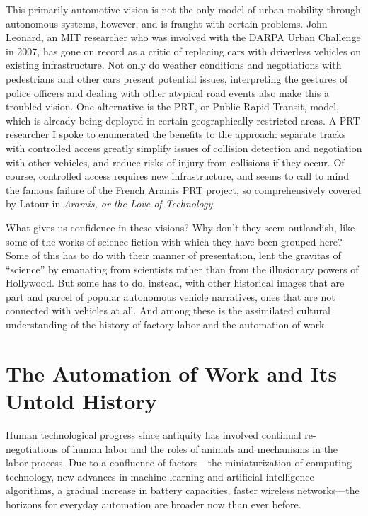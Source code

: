 This primarily automotive vision is not the only model of urban
mobility through autonomous systems, however, and is fraught with
certain problems. John Leonard, an MIT researcher who was involved
with the DARPA Urban Challenge in 2007, has gone on record as a critic
of replacing cars with driverless vehicles on existing infrastructure.
Not only do weather conditions and negotiations with pedestrians and
other cars present potential issues, interpreting the gestures of
police officers and dealing with other atypical road events also make
this a troubled vision. One alternative is the PRT, or Public Rapid
Transit, model, which is already being deployed in certain
geographically restricted areas. A PRT researcher I spoke to
enumerated the benefits to the approach: separate tracks with
controlled access greatly simplify issues of collision detection and
negotiation with other vehicles, and reduce risks of injury from collisions if
they occur. Of course, controlled access requires new infrastructure,
and seems to call to mind the famous failure of the French Aramis PRT
project, so comprehensively covered by Latour in \emph{Aramis, or the
  Love of Technology}. 

What gives us confidence in these visions? Why don't they seem
outlandish, like some of the works of science-fiction with which they have
been grouped here? Some of this has to do with their manner of
presentation, lent the gravitas of ``science'' by emanating from
scientists rather than from the
illusionary powers of Hollywood. But some has to do, instead, with other historical images
that are part and parcel of
popular autonomous vehicle narratives, ones that are not connected
with vehicles at all. And among these is the assimilated cultural
understanding of the history of factory labor and the automation of
work.


\section{The Automation of Work and Its Untold History}

Human technological progress since antiquity has
involved continual re-negotiations of human labor and the roles of
animals and mechanisms in the labor process. Due to a confluence
of factors---the miniaturization of computing technology, new
advances in machine learning and artificial intelligence algorithms, a
gradual increase in battery capacities, faster wireless networks---the
horizons for everyday automation are broader now than ever before. 

